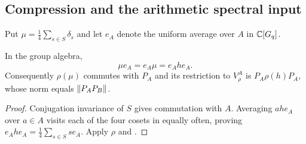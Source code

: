 \subsection{Compression and the arithmetic spectral input}
Put $\mu=\frac14\sum_{s\in S}\delta_s$ and let $e_A$ denote the
uniform average over $A$ in $\mathbb{C}[G_q]$.

\begin{lemma}
\label{lem:octahedral-compression}
In the group algebra,
\begin{equation}\label{eq:octahedral-compression}
 \mu e_A=e_A\mu=e_Ahe_A.
\end{equation}
Consequently $\rho(\mu)$ commutes with $P_A$ and its restriction to
$V_\rho^A$ is $P_A\rho(h)P_A$, whose norm equals $\lVert P_AP_B \rVert$.
\end{lemma}
\begin{proof}
Conjugation invariance of $S$ gives commutation with $A$. Averaging
$ahe_A$ over $a\in A$ visits each of the four cosets in
 equally often, proving
$e_Ahe_A=\frac14\sum_{s\in S}se_A$. Apply $\rho$ and
.
\end{proof}

